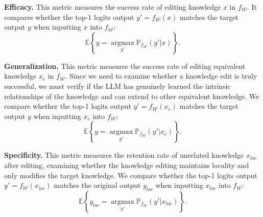 \textbf{Efficacy.} This metric measures the success rate of editing knowledge $x$ in $f_{\mathcal{W}}$. It compares whether the top-1 logits output $y'=f_{\mathcal{W}}(x)$ matches the target output $y$ when inputting $x$ into $f_\mathcal{W}$:
\begin{equation}
\mathbb{E}\left\{y=\mathop{\arg\max}\limits_{y'}\mathbb{P}_{f_\mathcal{W}}(y'\left|x\right.)\right\}.
\end{equation}

\textbf{Generalization.} This metric measures the success rate of editing equivalent knowledge $x_e$ in $f_{\mathcal{W}}$. Since we need to examine whether a knowledge edit is truly successful, we must verify if the LLM has genuinely learned the intrinsic relationships of the knowledge and can extend to other equivalent knowledge. We compare whether the top-1 logits output $y'=f_{\mathcal{W}}(x_e)$ matches the target output $y$ when inputting $x_e$ into $f_\mathcal{W}$:
\begin{equation}
\mathbb{E}\left\{y=\mathop{\arg\max}\limits_{y'}\mathbb{P}_{f_\mathcal{W}}(y'\left|x_e\right.)\right\}.
\end{equation}

\textbf{Specificity.} This metric measures the retention rate of unrelated knowledge $x_{loc}$ after editing, examining whether the knowledge editing maintains locality and only modifies the target knowledge. We compare whether the top-1 logits output $y'=f_{\mathcal{W}}(x_{loc})$ matches the original output $y_{loc}$ when inputting $x_{loc}$ into $f_\mathcal{W}$:
\begin{equation}
\mathbb{E}\left\{y_{loc}=\mathop{\arg\max}\limits_{y'}\mathbb{P}_{f_\mathcal{W}}(y'\left|x_{loc}\right.)\right\}.
\end{equation}


